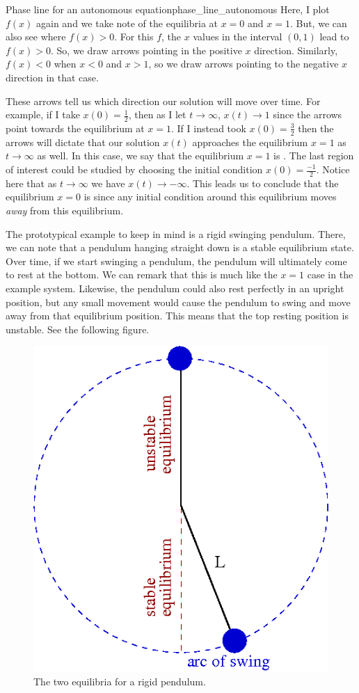 \begin{ex}{Phase line for an autonomous equation}{phase_line_autonomous}
                Here, I plot $f(x)$ again and we take note of the equilibria at $x=0$ and $x=1$. But, we can also see where $f(x)>0$. For this $f$, the $x$ values in the interval $(0,1)$ lead to $f(x)>0$.  So, we draw arrows pointing in the positive $x$ direction. Similarly, $f(x)<0$ when $x<0$ and $x>1$, so we draw arrows pointing to the negative $x$ direction in that case.

                These arrows tell us which direction our solution will move over time.  For example, if I take $x(0)=\frac{1}{2}$, then as I let $t\to \infty$, $x(t)\to 1$ since the arrows point towards the equilibrium at $x=1$.  If I instead took $x(0)=\frac{3}{2}$ then the arrows will dictate that our solution $x(t)$ approaches the equilibrium $x=1$ as $t\to\infty$ as well.  In this case, we say that the equilibrium $x=1$ is .  The last region of interest could be studied by choosing the initial condition $x(0)=\frac{-1}{2}$.  Notice here that as $t\to \infty$ we have $x(t)\to -\infty$.  This leads us to conclude that the equilibrium $x=0$ is  since any initial condition around this equilibrium moves \emph{away} from this equilibrium.
                \end{ex}

                The prototypical example to keep in mind is a rigid swinging pendulum.  There, we can note that a pendulum hanging straight down is a stable equilibrium state. Over time, if we start swinging a pendulum, the pendulum will ultimately come to rest at the bottom.  We can remark that this is much like the $x=1$ case in the example system.  Likewise, the pendulum could also rest perfectly in an upright position, but any small movement would cause the pendulum to swing and move away from that equilibrium position.  This means that the top resting position is unstable. See the following figure.

                \begin{figure}[H]
                    \centering
                    \includegraphics[width=.5\textwidth]{Figures_Part_1/pendulum.png}
                    \caption{The two equilibria for a rigid pendulum.}
                \end{figure}


